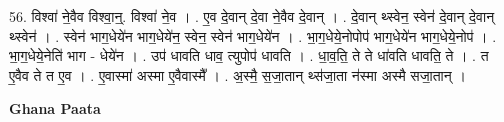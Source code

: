 \documentclass[17pt]{extarticle}
\begin{document}
56. विश्वा॑ ने॒वैव विश्वा॒न्॒. विश्वा॑ ने॒व । . ए॒व दे॒वान् दे॒वा ने॒वैव दे॒वान् । . दे॒वान् थ्स्वेन॒ स्वेन॑ दे॒वान् दे॒वान् थ्स्वेन॑ । . स्वेन॑ भाग॒धेये॑न भाग॒धेये॑न॒ स्वेन॒ स्वेन॑ भाग॒धेये॑न । . भा॒ग॒धेये॒नोपोप॑ भाग॒धेये॑न भाग॒धेये॒नोप॑ । . भा॒ग॒धेये॒नेति॑ भाग - धेये॑न । . उप॑ धावति धाव॒ त्युपोप॑ धावति । . धा॒व॒ति॒ ते ते धा॑वति धावति॒ ते । . त ए॒वैव ते त ए॒व । . ए॒वास्मा॑ अस्मा ए॒वैवास्मै᳚ । . अ॒स्मै॒ स॒जा॒तान् थ्स॑जा॒ता न॑स्मा अस्मै सजा॒तान् । \newline

\textbf{Ghana Paata } \newline
\end{document}
